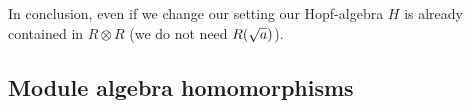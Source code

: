 \documentclass[10pt,a4paper]{article}
\begin{document}
In conclusion, even if we change our setting our Hopf-algebra $H$ is already contained in $R \otimes R$ (we do not need $R(\sqrt{a})$).
\subsection{Module algebra homomorphisms}
\end{document}
